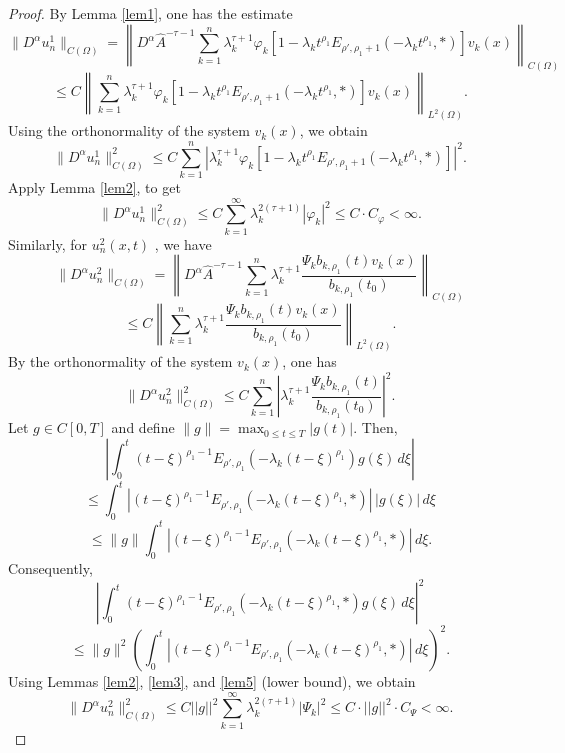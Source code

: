 \documentclass[12pt, reqno]{amsart}
\theoremstyle{definition}
\theoremstyle{remark}
\numberwithin{equation}{section}
\begin{document}
\begin{proof}
By Lemma \ref{lem1}, one has the estimate
\[
\| D^\alpha u_n^1 \|_{C(\Omega)}
=
\left\|
D^\alpha \widehat{A}^{-\tau-1}
\sum_{k=1}^{n}\lambda_k^{\tau+1}\varphi_k \left[ 1 - \lambda_k t^{\rho_1} E_{ \rho', \rho_1 + 1} \left( -\lambda_k t^{\rho_1}, * \right) \right]v_k(x)
\right\|_{C(\Omega)}
\]
\begin{equation}\label{5.17}
\le
C
\left\|
\sum_{k=1}^{n}\lambda_k^{\tau+1}\varphi_k \left[ 1 - \lambda_k t^{\rho_1} E_{ \rho', \rho_1 + 1} \left( -\lambda_k t^{\rho_1}, * \right) \right]v_k(x)
\right\|_{L^2(\Omega)} .
\end{equation}
Using the orthonormality of the system $v_k(x)$, we obtain
\[
\| D^\alpha u_n^1 \|_{C(\Omega)}^2
\le
C \sum_{k=1}^{n}
\left|
\lambda_k^{\tau+1}\varphi_k \left[ 1 - \lambda_k t^{\rho_1} E_{ \rho', \rho_1 + 1} \left( -\lambda_k t^{\rho_1}, * \right) \right]
\right|^2.
\]
Apply Lemma \ref{lem2}, to get
\[
\| D^\alpha u_n^1 \|_{C(\Omega)}^2
\le C\sum_{k=1}^{\infty} \lambda_k^{2(\tau+1)} |\varphi_k|^2 \le C\cdot C_{\varphi} < \infty.
\]
Similarly, for $u_n^2(x,t)$ , we have  
\[
\| D^\alpha u_n^2 \|_{C(\Omega)}
=
\left\|
D^\alpha \widehat{A}^{-\tau-1}
\sum_{k=1}^{n}\lambda_k^{\tau+1}\frac{\Psi_k b_{k,\rho_1}(t) v_k(x)}{b_{k,\rho_1}(t_0)}
\right\|_{C(\Omega)}
\]
\begin{equation}\label{5.18}
\le
C
\left\|
\sum_{k=1}^{n}\lambda_k^{\tau+1}\frac{\Psi_k b_{k,\rho_1}(t) v_k(x)}{b_{k,\rho_1}(t_0)}
\right\|_{L^2(\Omega)} .
\end{equation}
By the orthonormality of the system ${v_k(x)}$, one has
\[
\| D^\alpha u_n^2 \|_{C(\Omega)}^2
\le
C \sum_{k=1}^{n}
\left|
\lambda_k^{\tau+1}\frac{\Psi_k b_{k,\rho_1}(t)}{b_{k,\rho_1}(t_0)}
\right|^2.
\]
Let $ g \in  C[0,T] $ and define
$\|g\| = \displaystyle \max_{0 \le t \le T} |g(t)|.$
Then,
\[
\left|
\int_0^t (t-\xi)^{\rho_1 - 1}
E_{\rho',\rho_1}\!\left(
-\lambda_k (t-\xi)^{\rho_1}
\right)
g(\xi)\, d\xi
\right|\]
\[\le
\int_0^t
\left|
(t-\xi)^{\rho_1 - 1}
E_{\rho',\rho_1}\!\left(
-\lambda_k (t-\xi)^{\rho_1},*
\right)
\right|
\, |g(\xi)|\, d\xi
\]
\[
\le
\|g\|
\int_0^t
\left|
(t-\xi)^{\rho_1 - 1}
E_{\rho',\rho_1}\!\left(
-\lambda_k (t-\xi)^{\rho_1},*
\right)
\right|
\, d\xi .
\]
Consequently,
\[
\left|
\int_0^t (t-\xi)^{\rho_1 - 1}
E_{\rho',\rho_1}\!\left(
-\lambda_k (t-\xi)^{\rho_1},*
\right)
g(\xi)\, d\xi
\right|^2
\]\[
\le \|g\|^2
\left(
\int_0^t
\left|
(t-\xi)^{\rho_1 - 1}
E_{\rho',\rho_1}\!\left(
-\lambda_k (t-\xi)^{\rho_1},*
\right)
\right|
\, d\xi
\right)^2.
\]
Using Lemmas \ref{lem2}, \ref{lem3}, and \ref{lem5} (lower bound), we obtain 
\[
\| D^\alpha u_n^2 \|_{C(\Omega)}^2
\le
C||g||^2 \sum_{k=1}^{\infty} \lambda_k^{2(\tau+1)} |\Psi_k|^2 \le C\cdot ||g||^2\cdot C_{\Psi} < \infty.\]


\end{proof}
\end{document}
